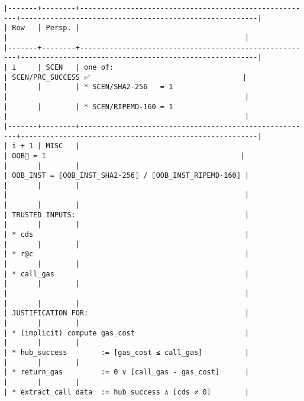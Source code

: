 \documentclass[varwidth=\maxdimen,margin=0.5cm,multi={verbatim}]{standalone}
\begin{document}
\begin{verbatim}
|-------+--------+-------------------------------------------------------+--------------------------------------------------------|
| Row   | Persp. |                                                       |                                                        |
|-------+--------+-------------------------------------------------------+--------------------------------------------------------|
| i     | SCEN   | one of:                                               | SCEN/PRC_SUCCESS ✅                                    |
|       |        | * SCEN/SHA2-256   = 1                                 |                                                        |
|       |        | * SCEN/RIPEMD-160 = 1                                 |                                                        |
|-------+--------+-------------------------------------------------------+--------------------------------------------------------|
| i + 1 | MISC   |                                                       | OOB🏴 = 1                                              |
|       |        |                                                       | OOB_INST = ⟦OOB_INST_SHA2-256⟧ / ⟦OOB_INST_RIPEMD-160⟧ |
|       |        |                                                       |                                                        |
|       |        |                                                       | TRUSTED INPUTS:                                        |
|       |        |                                                       | * cds                                                  |
|       |        |                                                       | * r@c                                                  |
|       |        |                                                       | * call_gas                                             |
|       |        |                                                       |                                                        |
|       |        |                                                       | JUSTIFICATION FOR:                                     |
|       |        |                                                       | * (implicit) compute gas_cost                          |
|       |        |                                                       | * hub_success        := [gas_cost ≤ call_gas]          |
|       |        |                                                       | * return_gas         := 0 ∨ [call_gas - gas_cost]      |
|       |        |                                                       | * extract_call_data  := hub_success ∧ [cds ≠ 0]        |

\end{verbatim}
\end{document}
